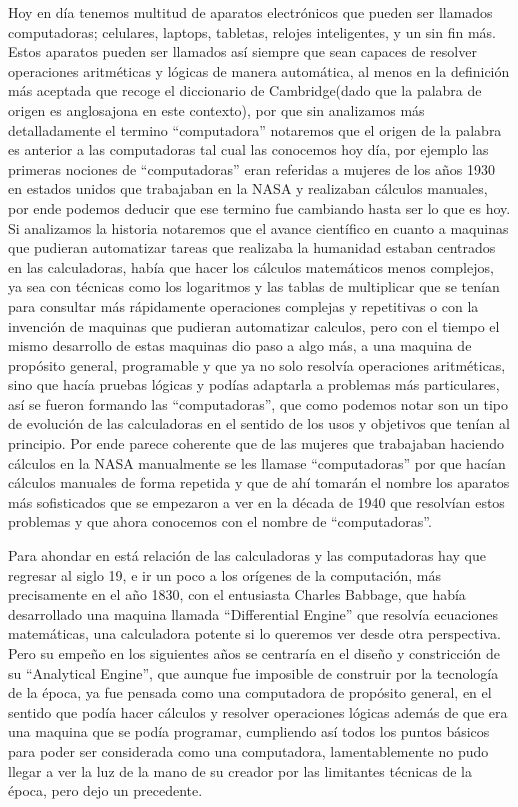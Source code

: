 \documentclass[letterpaper,12pt,oneside]{book}
\begin{document}
	Hoy en día tenemos multitud de aparatos electrónicos que pueden ser llamados computadoras; celulares, laptops, tabletas, relojes inteligentes, y un sin fin más. 
	Estos aparatos pueden ser llamados así siempre que sean  capaces de resolver operaciones aritméticas y lógicas de manera automática, al menos en la definición
	más aceptada que recoge el diccionario de Cambridge(dado que la palabra de origen es anglosajona en este contexto),
	por que sin analizamos más detalladamente el termino ``computadora''  notaremos que el origen de la palabra es anterior a las computadoras
	tal cual las conocemos hoy día, por ejemplo las primeras nociones de ``computadoras''  eran referidas a mujeres de los años 1930 en estados unidos
	que trabajaban en la NASA y realizaban cálculos manuales, por ende podemos deducir que ese termino fue cambiando hasta ser lo que es hoy.
	Si analizamos la historia notaremos que el avance científico en cuanto a maquinas
	que pudieran automatizar tareas que realizaba la humanidad estaban centrados en las calculadoras, había que hacer los cálculos matemáticos menos
	complejos, ya sea con técnicas como los logaritmos y las tablas de multiplicar que se tenían
	para consultar más rápidamente operaciones complejas y repetitivas o con la invención de maquinas que pudieran automatizar calculos, pero con el tiempo el mismo desarrollo de estas maquinas dio paso a algo más,
	a una maquina de propósito general, programable y que ya no solo resolvía operaciones aritméticas, sino que hacía pruebas lógicas y podías
	adaptarla a problemas más particulares, así se fueron formando las ``computadoras'', que como podemos notar son un tipo de evolución de las calculadoras en el sentido de los usos y objetivos
	que tenían al principio. Por ende parece coherente que	de las mujeres que trabajaban haciendo cálculos en la NASA manualmente se les llamase ``computadoras'' por que hacían cálculos manuales
	de forma repetida y que de ahí tomarán el nombre los aparatos más sofisticados que se empezaron a ver en la década de 1940 que resolvían estos problemas y que ahora conocemos con el nombre de ``computadoras''.
	
	Para ahondar en está relación de las calculadoras y las computadoras hay que regresar al siglo 19, e ir un poco a los orígenes de la computación,
    más precisamente en el año 1830, con el entusiasta Charles Babbage, que había desarrollado una maquina llamada ``Differential Engine''
	que resolvía ecuaciones matemáticas, una calculadora potente si lo queremos ver desde otra perspectiva. Pero su empeño en los siguientes años 
	se centraría en el diseño y constricción
	de su ``Analytical Engine'', que aunque fue imposible de construir por la tecnología de la época, ya fue pensada como una computadora
	de propósito general, en el sentido que podía hacer cálculos y resolver operaciones lógicas además de que era una maquina que se podía programar,
	cumpliendo así todos los puntos básicos para poder ser considerada como una computadora, lamentablemente no pudo llegar a ver la luz de la mano
	de su creador por las limitantes técnicas de la época, pero dejo un precedente.
	
\end{document}

